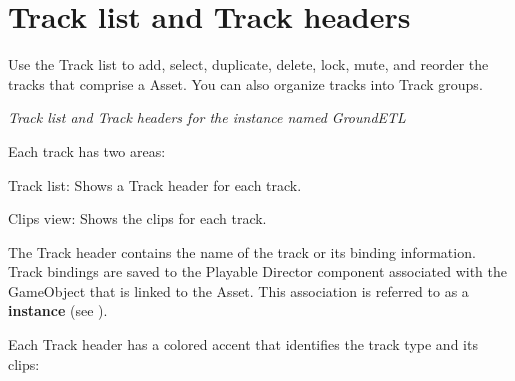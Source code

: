 \chapter{Track list and Track headers}
\hypertarget{md__hey_tea_9_2_library_2_package_cache_2com_8unity_8timeline_0d1_87_85_2_documentation_0i_2trk__list__about}{}\label{md__hey_tea_9_2_library_2_package_cache_2com_8unity_8timeline_0d1_87_85_2_documentation_0i_2trk__list__about}
\label{md__hey_tea_9_2_library_2_package_cache_2com_8unity_8timeline_0d1_87_85_2_documentation_0i_2trk__list__about_autotoc_md4759}%
%
 Use the Track list to add, select, duplicate, delete, lock, mute, and reorder the tracks that comprise a  Asset. You can also organize tracks into Track groups.



{\itshape Track list and Track headers for the  instance named Ground\+ETL}

Each track has two areas\+:


\begin{DoxyItemize}
\item Track list\+: Shows a Track header for each track.
\item Clips view\+: Shows the clips for each track.
\end{DoxyItemize}

The Track header contains the name of the track or its binding information. Track bindings are saved to the Playable Director component associated with the Game\+Object that is linked to the  Asset. This association is referred to as a {\bfseries{ instance}} (see ).

Each Track header has a colored accent that identifies the track type and its clips\+:


